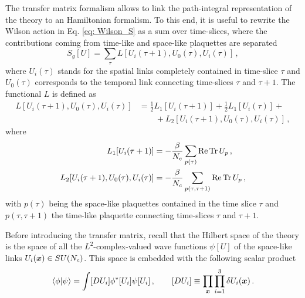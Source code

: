 \documentclass{article}
\begin{document}
The transfer matrix formalism allows to link the path-integral representation of the theory to an Hamiltonian formalism. To this end, it is useful to rewrite the Wilson action in Eq. \eqref{eq: Wilson_S} as a sum over time-slices, where the contributions coming from time-like and space-like plaquettes are separated \cite{Montvay:1994cy}
\begin{equation}
    S_g[U] = \sum_\tau L[U_i(\tau+1), U_0(\tau), U_i(\tau)] \, ,
\end{equation}
where $U_i(\tau)$ stands for the spatial links completely contained in time-slice $\tau$ and $U_0(\tau)$ corresponds to the temporal link connecting time-slices $\tau$ and $\tau+1$. The functional $L$ is defined as
\begin{equation}
    \begin{aligned}
        L[U_i(\tau+1), U_0(\tau), U_i(\tau)] &= \frac{1}{2} L_1[U_i(\tau+1)] + \frac{1}{2} L_1[U_i(\tau)] + \\
        &\qquad +L_2[U_i(\tau+1), U_0(\tau), U_i(\tau)] \, , 
    \end{aligned}
\end{equation}
where
\begin{align}
    L_1[U_i(\tau+1)] &= -\frac{\beta}{N_c} \sum_{p(\tau)} \Re \Tr U_p \, , \\
    L_2[U_i(\tau+1), U_0(\tau), U_i(\tau)] &= -\frac{\beta}{N_c} \sum_{p(\tau, \tau+1)} \Re \Tr U_p \, ,
\end{align}
with $p(\tau)$ being the space-like plaquettes contained in the time slice $\tau$ and $p(\tau, \tau+1)$ the time-like plaquette connecting time-slices $\tau$ and $\tau+1$. 

Before introducing the transfer matrix, recall that the Hilbert space of the theory is the space of all the $L^2$-complex-valued wave functions $\psi[U]$ of the space-like links $U_i(\vb*{x}) \in SU(N_c)$. This space is embedded with the following scalar product
\begin{equation}
    \braket{\phi}{\psi} = \int [D U_i] \phi^* [U_i] \psi[U_i] \, , \qquad [D U_i] \equiv \prod_{\vb*{x}} \prod_{i=1}^3 \delta U_i(\vb*{x}) \, .
\end{equation}



\printbibliography
\end{document}
